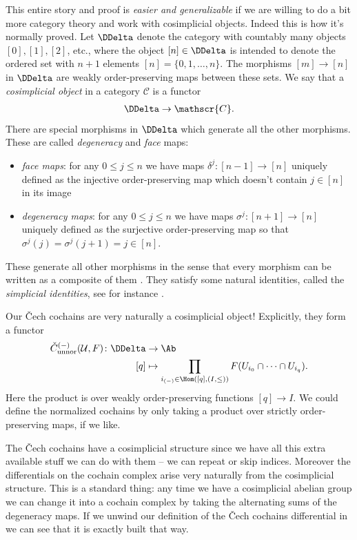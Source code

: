 \documentclass[11pt]{amsart}
\begin{document}
\begin{remark} This entire story and proof is \emph{easier and generalizable} if we are willing to do a bit more category theory and work with cosimplicial objects. Indeed this is how it's normally proved. Let $\DDelta$ denote the category with countably many objects $[0],[1],[2]$, etc., where the object $[n] \in \DDelta$ is intended to denote the ordered set with $n+1$ elements $[n] = \{0,1, \ldots, n\}$. The morphisms $[m]\to[n]$ in $\DDelta$ are weakly order-preserving maps between these sets. We say that a \emph{cosimplicial object} in a category $\mathscr{C}$ is a functor
\begin{align*}
    \DDelta \to \mathscr{C}.
\end{align*}
There are special morphisms in $\DDelta$ which generate all the other morphisms. These are called \emph{degeneracy} and \emph{face} maps:
\begin{itemize}
    \item \emph{face maps}: for any $0\le j\le n$ we have maps $\delta^j \colon [n-1]\to [n]$ uniquely defined as the injective order-preserving map which doesn't contain $j\in[n]$ in its image
    \item \emph{degeneracy maps}: for any $0\le j\le n$ we have maps $\sigma^j \colon [n+1]\to[n]$ uniquely defined as the surjective order-preserving map so that $\sigma^j(j)=\sigma^j(j+1)=j\in [n]$.
\end{itemize}
These generate all other morphisms in the sense that every morphism can be written as a composite of them \cite[0166]{Stacks}. They satisfy some natural identities, called the \emph{simplicial identities}, see for instance \cite[0167]{Stacks}.

Our \v{C}ech cochains are very naturally a cosimplicial object! Explicitly, they form a functor
\begin{align*}
    \check{C}^{(-)}_\text{unnor}(\mathcal{U},F) \colon \DDelta &\to \Ab \\
    [q] &\mapsto \prod_{i_{(-)} \in \Hom([q],(I,\le))} F(U_{i_0}\cap \cdots \cap U_{i_q}).
\end{align*}
Here the product is over weakly order-preserving functions $[q]\to I$. We could define the normalized cochains by only taking a product over strictly order-preserving maps, if we like. 

The \v{C}ech cochains have a cosimplicial structure since we have all this extra available stuff we can do with them -- we can repeat or skip indices. Moreover the differentials on the cochain complex arise very naturally from the cosimplicial structure. This is a standard thing: any time we have a cosimplicial abelian group we can change it into a cochain complex by taking the alternating sums of the degeneracy maps. If we unwind our definition of the \v{C}ech cochains differential in  we can see that it is exactly built that way. 


\end{remark}
\end{document}
